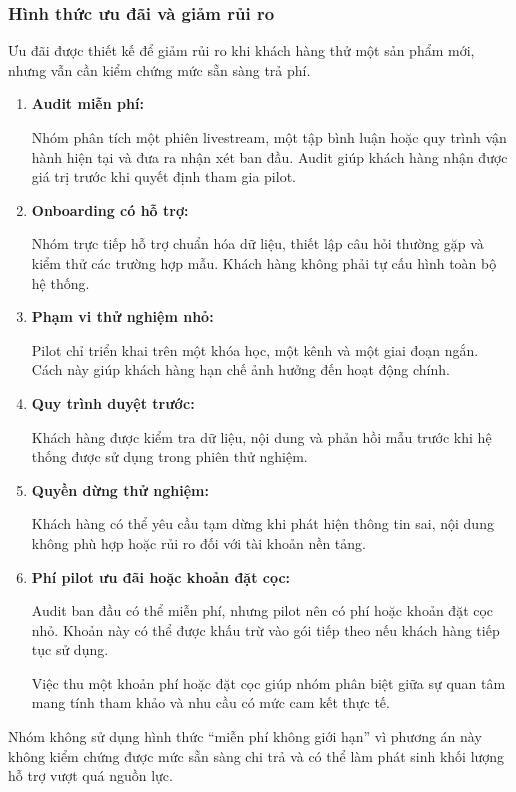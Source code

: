 \subsubsection{Hình thức ưu đãi và giảm rủi ro}

Ưu đãi được thiết kế để giảm rủi ro khi khách hàng thử một sản phẩm mới, nhưng vẫn cần kiểm chứng mức sẵn sàng trả phí.

\begin{enumerate}
    \item \textbf{Audit miễn phí:}

    Nhóm phân tích một phiên livestream, một tập bình luận hoặc quy trình vận hành hiện tại và đưa ra nhận xét ban đầu. Audit giúp khách hàng nhận được giá trị trước khi quyết định tham gia pilot.

    \item \textbf{Onboarding có hỗ trợ:}

    Nhóm trực tiếp hỗ trợ chuẩn hóa dữ liệu, thiết lập câu hỏi thường gặp và kiểm thử các trường hợp mẫu. Khách hàng không phải tự cấu hình toàn bộ hệ thống.

    \item \textbf{Phạm vi thử nghiệm nhỏ:}

    Pilot chỉ triển khai trên một khóa học, một kênh và một giai đoạn ngắn. Cách này giúp khách hàng hạn chế ảnh hưởng đến hoạt động chính.

    \item \textbf{Quy trình duyệt trước:}

    Khách hàng được kiểm tra dữ liệu, nội dung và phản hồi mẫu trước khi hệ thống được sử dụng trong phiên thử nghiệm.

    \item \textbf{Quyền dừng thử nghiệm:}

    Khách hàng có thể yêu cầu tạm dừng khi phát hiện thông tin sai, nội dung không phù hợp hoặc rủi ro đối với tài khoản nền tảng.

    \item \textbf{Phí pilot ưu đãi hoặc khoản đặt cọc:}

    Audit ban đầu có thể miễn phí, nhưng pilot nên có phí hoặc khoản đặt cọc nhỏ. Khoản này có thể được khấu trừ vào gói tiếp theo nếu khách hàng tiếp tục sử dụng.

    Việc thu một khoản phí hoặc đặt cọc giúp nhóm phân biệt giữa sự quan tâm mang tính tham khảo và nhu cầu có mức cam kết thực tế.
\end{enumerate}

Nhóm không sử dụng hình thức ``miễn phí không giới hạn'' vì phương án này không kiểm chứng được mức sẵn sàng chi trả và có thể làm phát sinh khối lượng hỗ trợ vượt quá nguồn lực.

